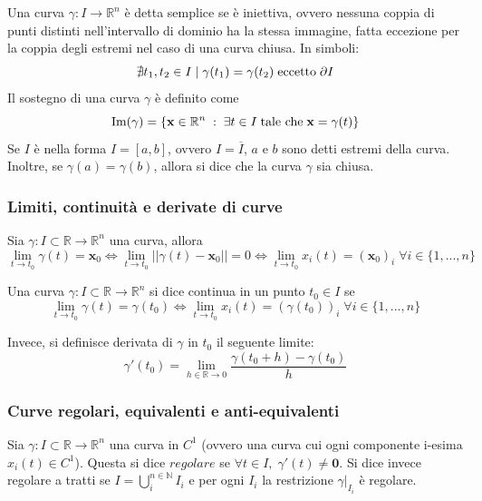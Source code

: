 \documentclass{article}
\begin{document}
        Una curva $\gamma: I \rightarrow \mathbb{R}^{n}$ è detta semplice se è iniettiva, ovvero nessuna coppia di punti distinti nell'intervallo di dominio ha la stessa immagine, fatta eccezione per la coppia degli estremi nel caso di una curva chiusa. In simboli:
        \[
            \nexists t_1, t_2 \in I \; | \; \gamma(t_1) = \gamma(t_2) \; \textnormal{eccetto} \; \partial I
        \]
        Il sostegno di una curva $\gamma$ è definito come
        \[
            \textnormal{Im}(\gamma) = \{ \mathbf{x} \in \mathbb{R}^{n} \; : \; \exists t \in I \; \textnormal{tale che} \; \mathbf{x} = \gamma(t)\}
        \]
        Se $I$ è nella forma $I = [a, b]$, ovvero $I = \overline{I}$, $a$ e $b$ sono detti estremi della curva. Inoltre, se $\gamma(a) = \gamma(b)$, allora si dice che la curva $\gamma$ sia chiusa.

        \subsubsection{Limiti, continuità e derivate di curve}
            Sia $\gamma: I \subset \mathbb{R} \rightarrow \mathbb{R}^{n}$ una curva, allora
            \[
                \lim_{t \rightarrow t_0} \gamma(t) = \mathbf{x}_0 \iff \lim_{t \rightarrow t_0} ||\gamma(t) - \mathbf{x}_0|| = 0 \iff \lim_{t \rightarrow t_0} x_i(t) = (\mathbf{x}_0)_i \; \forall i \in \{1, ..., n\}
            \]

            Una curva $\gamma: I \subset \mathbb{R} \rightarrow \mathbb{R}^{n}$ si dice continua in un punto $t_0 \in I$ se
            \[
                \lim_{t \rightarrow t_0} \gamma(t) = \gamma(t_0) \iff \lim_{t \rightarrow t_0} x_i(t) = (\gamma(t_0))_i \; \forall i \in \{1, ..., n\}
            \]
            
            Invece, si definisce derivata di $\gamma$ in $t_0$ il seguente limite:
            \[
                \gamma'(t_0) = \lim_{h \in \mathbb{R} \rightarrow 0} \frac{\gamma(t_0 + h) - \gamma(t_0)}{h}
            \]
        
        \subsubsection{Curve regolari, equivalenti e anti-equivalenti} 
            Sia $\gamma: I \subset \mathbb{R} \rightarrow \mathbb{R}^{n}$ una curva in $C^{1}$ (ovvero una curva cui ogni componente i-esima $x_i(t) \in C^1$). Questa si dice $\textit{regolare}$ se $\forall t \in I, \; \gamma'(t) \neq \mathbf{0}$. 
            Si dice invece regolare a tratti se $I = \bigcup_{i}^{n \in \mathbb{N}} I_{i}$ e per ogni $I_{i}$ la restrizione $\gamma|_{I_{i}}$ è regolare.
        
\end{document}
